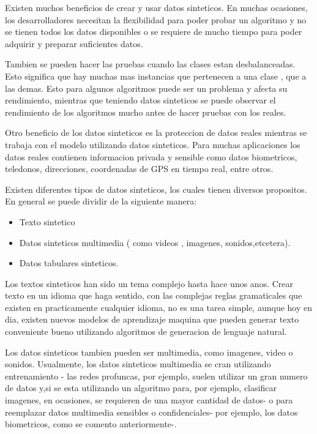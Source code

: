 \documentclass[12pt]{article}
\begin{document}
Existen muchos beneficios de crear y usar datos sinteticos. En muchas ocasiones, los desarrolladores necesitan la flexibilidad para poder probar un algoritmo y no se tienen todos los datos disponibles o se requiere
de mucho tiempo para poder adquirir y preparar suficientes datos.

Tambien se pueden hacer las pruebas cuando las clases estan desbalanceadas. Esto significa que hay muchas mas instancias que pertenecen a una clase , que a las demas. Esto para algunos algoritmos puede ser un problema y afecta su rendimiento, mientras que teniendo datos sinteticos se puede observar el rendimiento  de los algoritmos
mucho antes de hacer pruebas con los reales.

Otro beneficio de los datos sinteticos es la proteccion de datos reales mientras se trabaja con el modelo utilizando datos sinteticos. Para muchas aplicaciones los datos reales contienen informacion privada y sensible como datos biometricos, teledonos, direcciones, coordenadas de GPS en tiempo real, entre otros.

Existen diferentes tipos de datos sinteticos, los cuales tienen diversos propositos. En general se puede dividir de la siguiente manera:
\begin{itemize}
    \item Texto sintetico
    \item Datos sinteticos multimedia ( como videos , imagenes, sonidos,etcetera).
    \item Datos tabulares sinteticos.
\end{itemize}

Los textos sinteticos han sido un tema complejo hasta hace unos anos. Crear texto en un idioma que haga sentido, con las complejas reglas gramaticales que existen en practicamente cualquier idioma, no es una tarea simple, aunque hoy en dia, existen nuevos modelos de aprendizaje maquina que pueden generar texto conveniente bueno utilizando algoritmos de generacion de lenguaje natural.

Los datos sinteticos tambien pueden ser multimedia, como imagenes, video o sonidos. Usualmente, los datos sinteticos multimedia se cran utilizando entrenamiento - las redes profuncas,
por ejemplo, suelen utilizar un gran numero de datos y,si se esta utilizando un algoritmo para, por ejemplo, clasificar imagenes, en ocasiones, se requieren de una mayor cantidad de datos- o para reemplazar datos multimedia sensibles o confidenciales- por ejemplo, los datos biometricos, como se comento anteriormente-.
~\cite{De0a100enIA}
\end{document}
